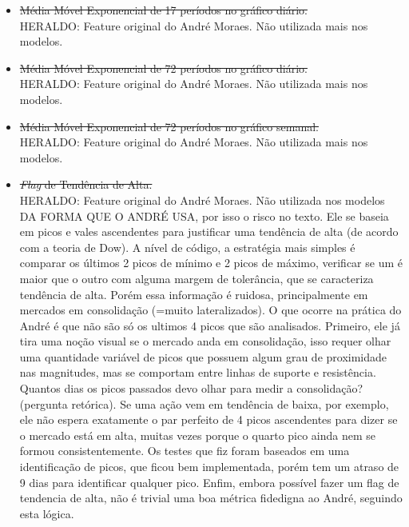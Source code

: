 \begin{itemize}
    \item \sout{Média Móvel Exponencial de 17 períodos no gráfico diário.} \\
    \color{red} HERALDO: Feature original do André Moraes. Não utilizada mais nos modelos. 


    \item \sout{Média Móvel Exponencial de 72 períodos no gráfico diário.} \\
    \color{red} HERALDO: Feature original do André Moraes. Não utilizada mais nos modelos. 


    \item \sout{Média Móvel Exponencial de 72 períodos no gráfico semanal.} \\
    \color{red} HERALDO: Feature original do André Moraes. Não utilizada mais nos modelos. 


    \item \sout{\textit{Flag} de Tendência de Alta.} \\
    \color{red} HERALDO: Feature original do André Moraes. Não utilizada nos modelos DA FORMA QUE O ANDRÉ USA, por isso o risco no texto. Ele se baseia em picos e vales ascendentes para justificar uma tendência de alta (de acordo com a teoria de Dow). A nível de código, a estratégia mais simples é comparar os últimos 2 picos de mínimo e 2 picos de máximo, verificar se um é maior que o outro com alguma margem de tolerância, que se caracteriza tendência de alta. Porém essa informação é ruidosa, principalmente em mercados em consolidação (=muito lateralizados). O que ocorre na prática do André é que não são só os ultimos 4 picos que são analisados. Primeiro, ele já tira uma noção visual se o mercado anda em consolidação, isso requer olhar uma quantidade variável de picos que possuem algum grau de proximidade nas magnitudes, mas se comportam entre linhas de suporte e resistência. Quantos dias os picos passados devo olhar para medir a consolidação? (pergunta retórica). Se uma ação vem em tendência de baixa, por exemplo, ele não espera exatamente o par perfeito de 4 picos ascendentes para dizer se o mercado está em alta, muitas vezes porque o quarto pico ainda nem se formou consistentemente. Os testes que fiz foram baseados em uma identificação de picos, que ficou bem implementada, porém tem um atraso de 9 dias para identificar qualquer pico. Enfim, embora possível fazer um flag de tendencia de alta, não é trivial uma boa métrica fidedigna ao André, seguindo esta lógica. 



\end{itemize}
